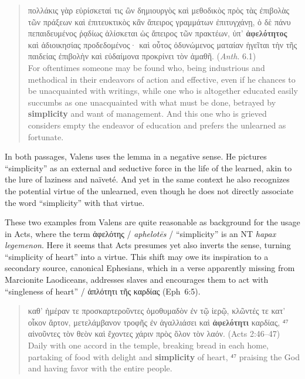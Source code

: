  \begin{quote}πολλάκις γὰρ εὑρίσκεταί τις ὢν δημιουργὸς καὶ μεθοδικὸς %
 πρὸς τὰς ἐπιβολὰς τῶν πράξεων καὶ ἐπιτευκτικὸς κἂν ἄπειρος γραμμάτων ἐπιτυγχάνῃ, %
 ὁ δὲ πάνυ πεπαιδευμένος ῥᾳδίως ἁλίσκεται ὡς ἄπειρος τῶν πρακτέων, %
 ὑπ’ \textbf{ἀφελότητος} καὶ ἀδιοικησίας προδεδομένος· %
 καὶ οὗτος ὀδυνώμενος ματαίαν ἡγεῖται τὴν τῆς παιδείας %
 ἐπιβολὴν καὶ εὐδαίμονα προκρίνει τὸν ἀμαθῆ. (\textit{Anth}. 6.1) \\[1mm] %
 For oftentimes someone may be found who, %
 being industrious and methodical in their endeavors of action and effective, %
 even if he chances to be unacquainted with writings, %
 while one who is altogether educated easily succumbs as one unacquainted with what must be done, %
 betrayed by \textbf{simplicity} and want of management. %
 And this one who is grieved considers empty the endeavor of education %
 and prefers the unlearned as fortunate.\end{quote} %
 \vspace*{3mm}

\noindent{}In both passages, Valens uses the lemma in a negative sense. %
He pictures “simplicity” as an external and seductive force in the life of the learned, %
akin to the lure of laziness and naïveté. %
And yet in the same context he also recognizes the potential virtue of the unlearned, %
even though he does not directly associate the word “simplicity” with that virtue. %

These two examples from Valens are quite reasonable as background for %
the usage in Acts, %
where the term ἀφελότης / \textit{aphelotēs} / “simplicity” is an NT \textit{hapax legemenon}. %
Here it seems that Acts presumes yet also inverts the sense, %
turning “simplicity of heart” into a virtue. %
This shift may owe its inspiration to a secondary source, %
canonical Ephesians, which in a verse apparently missing from Marcionite Laodiceans, %
addresses slaves and encourages them to act with “singleness of heart” / %
ἁπλότητι τῆς καρδίας (Eph 6:5). 

\vspace*{3mm} 
 \begin{quote}καθ’ ἡμέραν τε προσκαρτεροῦντες ὁμοθυμαδὸν ἐν τῷ ἱερῷ,
 κλῶντές τε κατ’ οἶκον ἄρτον, %
 μετελάμβανον τροφῆς ἐν ἀγαλλιάσει καὶ \textbf{ἀφελότητι} καρδίας, %
 ⁴⁷ αἰνοῦντες τὸν θεὸν καὶ ἔχοντες χάριν πρὸς ὅλον τὸν λαόν. (Acts 2:46--47) \\[1mm] %
 Daily with one accord in the temple, %
 breaking bread in each home, %
 partaking of food with delight and \textbf{simplicity} of heart, %
 ⁴⁷ praising the God and having favor with the entire people.\end{quote} %
 \vspace*{3mm} 

